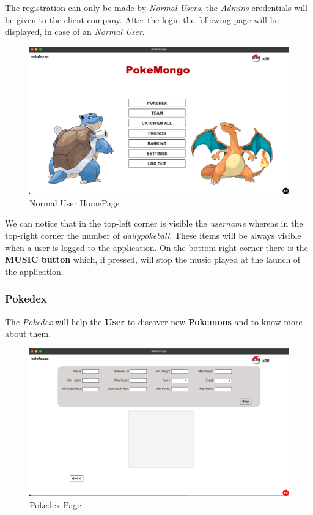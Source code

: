 The registration can only be made by \textit{Normal Users}, the \textit{Admins} credentials will be given to the client company.
After the login the following page will be displayed, in case of an \textit{Normal User}.
\begin{figure}[H]
	\centering
	\includegraphics[width=\textwidth]{img/userManual/main.png}
	\caption{Normal User HomePage}
\end{figure}
We can notice that in the top-left corner is visible the \textit{username} whereas in the top-right corner the number of \textit{dailypokeball}. These items will be always visible when a user is logged to the application. On the bottom-right corner there is the \textbf{MUSIC button} which, if pressed, will stop the music played at the launch of the application.

\subsubsection{Pokedex}
The \textit{Pokedex} will help the \textbf{User} to discover new \textbf{Pokemons} and to know more about them.
\begin{figure}[H]
	\centering
	\includegraphics[width=\textwidth]{img/userManual/pokedex.png}
	\caption{Pokedex Page}
\end{figure}


